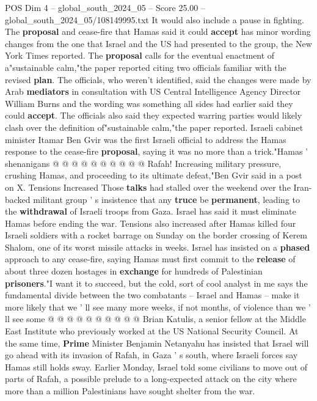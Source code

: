\begin{textsample}{POS Dim 4 – global\_south\_2024\_05 – Score 25.00 – global\_south\_2024\_05/108149995.txt}
It would also include a pause in fighting.
The \textbf{proposal} and cease-fire that Hamas said it could \textbf{accept} has minor wording changes from the one that Israel and the US had presented to the group, the New York Times reported.
The \textbf{proposal} calls for the eventual enactment of a"sustainable calm,"the paper reported citing two officials familiar with the revised \textbf{plan}.
The officials, who weren't identified, said the changes were made by Arab \textbf{mediators} in consultation with US Central Intelligence Agency Director William Burns and the wording was something all sides had earlier said they could \textbf{accept}.
The officials also said they expected warring parties would likely clash over the definition of"sustainable calm,"the paper reported.
Israeli cabinet minister Itamar Ben Gvir was the first Israeli official to address the Hamas response to the cease-fire \textbf{proposal}, saying it was no more than a trick."Hamas ' shenanigans @ @ @ @ @ @ @ @ @ @ Rafah!
Increasing military pressure, crushing Hamas, and proceeding to its ultimate defeat,"Ben Gvir said in a post on X.
Tensions Increased Those \textbf{talks} had stalled over the weekend over the Iran-backed militant group ' s insistence that any \textbf{truce} be \textbf{permanent}, leading to the \textbf{withdrawal} of Israeli troops from Gaza.
Israel has said it must eliminate Hamas before ending the war.
Tensions also increased after Hamas killed four Israeli soldiers with a rocket barrage on Sunday on the border crossing of Kerem Shalom, one of its worst missile attacks in weeks.
Israel has insisted on a \textbf{phased} approach to any cease-fire, saying Hamas must first commit to the \textbf{release} of about three dozen hostages in \textbf{exchange} for hundreds of Palestinian \textbf{prisoners}."I want it to succeed, but the cold, sort of cool analyst in me says the fundamental divide between the two combatants -- Israel and Hamas -- make it more likely that we ' ll see many more weeks, if not months, of violence than we ' ll see some @ @ @ @ @ @ @ @ @ @ Brian Katulis, a senior fellow at the Middle East Institute who previously worked at the US National Security Council.
At the same time, \textbf{Prime} Minister Benjamin Netanyahu has insisted that Israel will go ahead with its invasion of Rafah, in Gaza ' s south, where Israeli forces say Hamas still holds sway.
Earlier Monday, Israel told some civilians to move out of parts of Rafah, a possible prelude to a long-expected attack on the city where more than a million Palestinians have sought shelter from the war.

\end{textsample}
